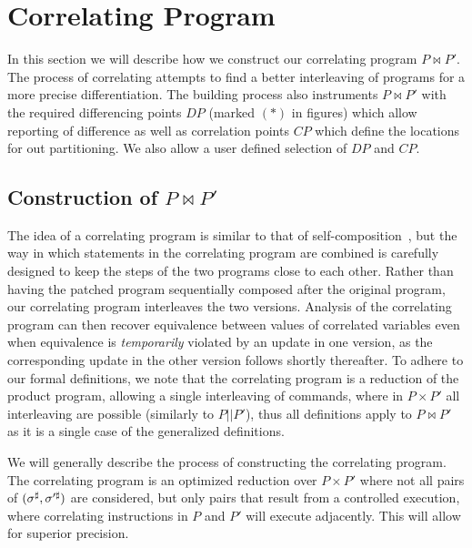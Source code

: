 \section{Correlating Program} 

In this section we will describe how we construct our correlating program $P \bowtie P'$. The process of correlating attempts to find a better interleaving of programs for a more precise differentiation. The building process also instruments $P \bowtie P'$ with the required differencing points $DP$ (marked $(*)$ in figures) which allow reporting of difference as well as correlation points $CP$ which define the locations for out partitioning. We also allow a user defined selection of $DP$ and $CP$.

\subsection{Construction of $P \bowtie P'$ }
The idea of a correlating program is similar to that of
self-composition~\cite{AikenTerauchi05}, but the way in
which statements in the correlating program are combined is carefully designed to
keep the steps of the two programs close to each other. Rather than having
the patched program sequentially composed after the original program, our
correlating program interleaves the two versions. Analysis of the correlating program can then recover equivalence between values of correlated variables even when
equivalence is \emph{temporarily} violated by an update in one version, as
the corresponding update in the other version follows shortly thereafter. To adhere to our formal definitions, we note that the correlating program is a reduction of the product program, allowing a single interleaving of commands, where in $P \times P'$ all interleaving are possible (similarly to $P||P'$), thus all definitions apply to $P \bowtie P'$ as it is a single case of the generalized definitions.

We will generally describe the process of constructing the correlating program. The correlating program is an optimized reduction over $P \times P'$ where not all pairs of $(\sigma^\sharp,\sigma'^\sharp)$ are considered, but only pairs that result from a controlled execution, where correlating instructions in $P$ and $P'$ will execute adjacently. This will allow for superior precision.

